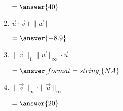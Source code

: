 \documentclass{ximera}
\begin{document}
\begin{exercise}
\begin{enumerate}
      \begin{prompt}
        $=\answer{40}$
      \end{prompt}
    \item $\vec{u} \cdot \vec{v} + \|\vec{w}\|$
      \begin{prompt}
        $=\answer{-8.9}$
      \end{prompt}
    \item $\|\vec{v}\|_{1} \|\vec{w}\|_{\infty} \cdot \vec{u}$
      \begin{prompt}
        $=\answer[format=string]{NA}$
      \end{prompt}
    \item $\|\vec{v}\|_{\infty} \cdot \|\vec{u}\|_{\infty}$
      \begin{prompt}
        $=\answer{20}$
      \end{prompt}
  \end{enumerate}
\end{exercise}
\end{document}
